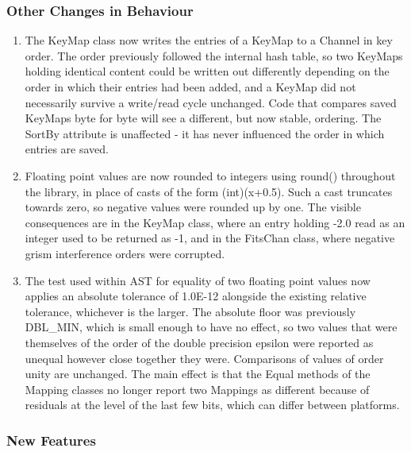 \documentclass[twoside,11pt]{starlink}
\begin{document}
\subsubsection{Other Changes in Behaviour}

\begin{enumerate}
\item The KeyMap class now writes the entries of a KeyMap to a Channel in key order.
  The order previously followed the internal hash table, so two KeyMaps holding identical content could be written out differently depending on the order in which their entries had been added, and a KeyMap did not necessarily survive a write/read cycle unchanged.
  Code that compares saved KeyMaps byte for byte will see a different, but now stable, ordering.
  The SortBy attribute is unaffected - it has never influenced the order in which entries are saved.
\item Floating point values are now rounded to integers using round() throughout the library, in place of casts of the form (int)(x+0.5).
  Such a cast truncates towards zero, so negative values were rounded up by one.
  The visible consequences are in the KeyMap class, where an entry holding -2.0 read as an integer used to be returned as -1, and in the FitsChan class, where negative grism interference orders were corrupted.
\item The test used within AST for equality of two floating point values now applies an absolute tolerance of 1.0E-12 alongside the existing relative tolerance, whichever is the larger.
  The absolute floor was previously DBL\_MIN, which is small enough to have no effect, so two values that were themselves of the order of the double precision epsilon were reported as unequal however close together they were.
  Comparisons of values of order unity are unchanged.
  The main effect is that the Equal methods of the Mapping classes no longer report two Mappings as different because of residuals at the level of the last few bits, which can differ between platforms.
\end{enumerate}

\subsubsection{New Features}
\end{document}
